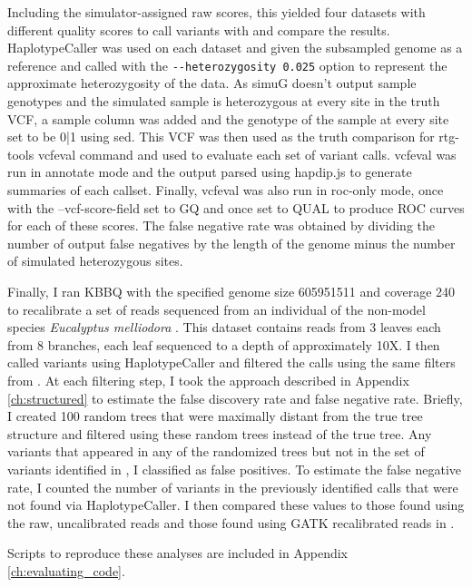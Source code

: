 Including the simulator-assigned raw scores, this yielded four datasets with different quality scores to call variants with and compare the results. HaplotypeCaller was used on each dataset and given the subsampled genome as a reference and called with the \texttt{-\phantom{}-heterozygosity 0.025} option to represent the approximate heterozygosity of the data. As simuG doesn't output sample genotypes and the simulated sample is heterozygous at every site in the truth VCF, a sample column was added and the genotype of the sample at every site set to be 0|1 using sed. This VCF was then used as the truth comparison for rtg-tools vcfeval command and used to evaluate each set of variant calls. vcfeval was run in annotate mode and the output parsed using hapdip.js to generate summaries of each callset. Finally, vcfeval was also run in roc-only mode, once with the --vcf-score-field set to GQ and once set to QUAL to produce ROC curves for each of these scores. The false negative rate was obtained by dividing the number of output false negatives by the length of the genome minus the number of simulated heterozygous sites.

Finally, I ran KBBQ with the specified genome size 605951511 and coverage 240 to recalibrate a set of reads sequenced from an individual of the non-model species \textit{Eucalyptus melliodora} \parencite{orr_phylogenomic_2020}. This dataset contains reads from 3 leaves each from 8 branches, each leaf sequenced to a depth of approximately 10X. I then called variants using HaplotypeCaller and filtered the calls using the same filters from \cite{orr_phylogenomic_2020}. At each filtering step, I took the approach described in Appendix \ref{ch:structured} to estimate the false discovery rate and false negative rate. Briefly, I created 100 random trees that were maximally distant from the true tree structure and filtered using these random trees instead of the true tree. Any variants that appeared in any of the randomized trees but not in the set of variants identified in \cite{orr_phylogenomic_2020}, I classified as false positives. To estimate the false negative rate, I counted the number of variants in the previously identified calls that were not found via HaplotypeCaller. I then compared these values to those found using the raw, uncalibrated reads and those found using GATK recalibrated reads in \cite{orr_phylogenomic_2020}.

Scripts to reproduce these analyses are included in Appendix \ref{ch:evaluating_code}.

